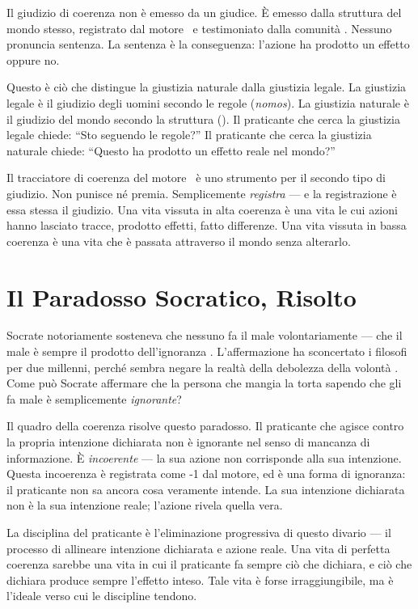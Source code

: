 Il giudizio di coerenza non \`e emesso da un giudice. \`E emesso dalla
struttura del mondo stesso, registrato dal motore \physis\ e testimoniato
dalla comunit\`a \praxis. Nessuno pronuncia sentenza. La sentenza \`e
la conseguenza: l'azione ha prodotto un effetto oppure no.

Questo \`e ci\`o che distingue la giustizia naturale dalla giustizia
legale. La giustizia legale \`e il giudizio degli uomini secondo le
regole (\emph{nomos}). La giustizia naturale \`e il giudizio del mondo
secondo la struttura (\physis). Il praticante che cerca la giustizia
legale chiede: ``Sto seguendo le regole?'' Il praticante che cerca la
giustizia naturale chiede: ``Questo ha prodotto un effetto reale nel
mondo?''

Il tracciatore di coerenza del motore \physis\ \`e uno strumento per
il secondo tipo di giudizio. Non punisce n\'e premia. Semplicemente
\emph{registra} --- e la registrazione \`e essa stessa il giudizio.
Una vita vissuta in alta coerenza \`e una vita le cui azioni hanno
lasciato tracce, prodotto effetti, fatto differenze. Una vita vissuta
in bassa coerenza \`e una vita che \`e passata attraverso il mondo
senza alterarlo.

\section{Il Paradosso Socratico, Risolto}

Socrate notoriamente sosteneva che nessuno fa il male volontariamente
--- che il male \`e sempre il prodotto dell'ignoranza
\parencite{plato1997complete}. L'affermazione ha sconcertato i filosofi
per due millenni, perch\'e sembra negare la realt\`a della debolezza
della volont\`a \parencite{macintyre1981virtue}. Come pu\`o Socrate affermare che la persona che mangia
la torta sapendo che gli fa male \`e semplicemente \emph{ignorante}?

Il quadro della coerenza risolve questo paradosso. Il praticante che
agisce contro la propria intenzione dichiarata non \`e ignorante nel
senso di mancanza di informazione. \`E \emph{incoerente} --- la sua
azione non corrisponde alla sua intenzione. Questa incoerenza \`e
registrata come -1 dal motore, ed \`e una forma di ignoranza: il
praticante non sa ancora cosa veramente intende. La sua intenzione
dichiarata non \`e la sua intenzione reale; l'azione rivela quella
vera.

La disciplina del praticante \`e l'eliminazione progressiva di questo
divario --- il processo di allineare intenzione dichiarata e azione
reale. Una vita di perfetta coerenza sarebbe una vita in cui il
praticante fa sempre ci\`o che dichiara, e ci\`o che dichiara produce
sempre l'effetto inteso. Tale vita \`e forse irraggiungibile, ma \`e
l'ideale verso cui le discipline tendono.

